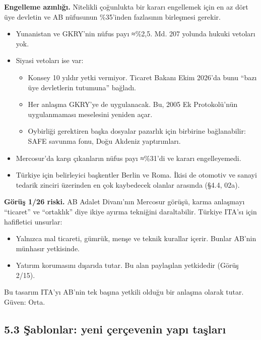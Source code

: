 \endgroup

\textbf{Engelleme azınlığı.} Nitelikli çoğunlukta bir kararı engellemek için en az dört üye devletin ve AB nüfusunun \%35'inden fazlasının birleşmesi gerekir.

\begin{itemize}
\tightlist
\item
  Yunanistan ve GKRY'nin nüfus payı ≈\%2,5. Md. 207 yolunda hukuki vetoları yok.
\item
  Siyasi vetoları ise var:

  \begin{itemize}
  \tightlist
  \item
    Konsey 10 yıldır yetki vermiyor. Ticaret Bakanı Ekim 2026'da bunu ``bazı üye devletlerin tutumuna'' bağladı.
  \item
    Her anlaşma GKRY'ye de uygulanacak. Bu, 2005 Ek Protokolü'nün uygulanmaması meselesini yeniden açar.
  \item
    Oybirliği gerektiren başka dosyalar pazarlık için birbirine bağlanabilir: SAFE savunma fonu, Doğu Akdeniz yaptırımları.
  \end{itemize}
\item
  Mercosur'da karşı çıkanların nüfus payı ≈\%31'di ve kararı engelleyemedi.
\item
  Türkiye için belirleyici başkentler Berlin ve Roma. İkisi de otomotiv ve sanayi tedarik zinciri üzerinden en çok kaybedecek olanlar arasında (§4.4, 02a).
\end{itemize}

\textbf{Görüş 1/26 riski.} AB Adalet Divanı'nın Mercosur görüşü, karma anlaşmayı ``ticaret'' ve ``ortaklık'' diye ikiye ayırma tekniğini daraltabilir. Türkiye ITA'sı için hafifletici unsurlar:

\begin{itemize}
\tightlist
\item
  Yalnızca mal ticareti, gümrük, menşe ve teknik kurallar içerir. Bunlar AB'nin münhasır yetkisinde.
\item
  Yatırım korumasını dışarıda tutar. Bu alan paylaşılan yetkidedir (Görüş 2/15).
\end{itemize}

Bu tasarım ITA'yı AB'nin tek başına yetkili olduğu bir anlaşma olarak tutar. \etiketH{} Güven: Orta.

\hypertarget{02b_secenekler_hukuk-53-ux15fablonlar-yeni-uxe7eruxe7evenin-yapux131-taux15flarux131}{%
\subsection{5.3 Şablonlar: yeni çerçevenin yapı taşları}\label{02b_secenekler_hukuk-53-ux15fablonlar-yeni-uxe7eruxe7evenin-yapux131-taux15flarux131}}

